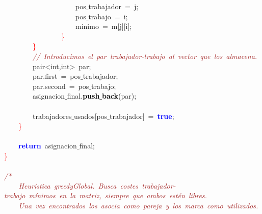 \mbox{}\ \ \ \ \ \ \ \ \ \ \ \ \ \ \ \ \ \ \ \ pos$\_$trabajador\ \textcolor{BrickRed}{=}\ j\textcolor{BrickRed}{;}\  \\
\mbox{}\ \ \ \ \ \ \ \ \ \ \ \ \ \ \ \ \ \ \ \ pos$\_$trabajo\ \textcolor{BrickRed}{=}\ i\textcolor{BrickRed}{;}\  \\
\mbox{}\ \ \ \ \ \ \ \ \ \ \ \ \ \ \ \ \ \ \ \ minimo\ \textcolor{BrickRed}{=}\ m\textcolor{BrickRed}{[}j\textcolor{BrickRed}{][}i\textcolor{BrickRed}{];}\  \\
\mbox{}\ \ \ \ \ \ \ \ \ \ \ \ \ \ \ \ \textcolor{Red}{\}}\ \ \ \  \\
\mbox{}\ \ \ \ \ \ \ \ \textcolor{Red}{\}} \\
\mbox{}\ \ \ \ \ \ \ \ \textit{\textcolor{Brown}{//\ Introducimos\ el\ par\ trabajador-trabajo\ al\ vector\ que\ los\ almacena.\ }} \\
\mbox{}\ \ \ \ \ \ \ \ \textcolor{TealBlue}{pair\textless{}int,int\textgreater{}}\ par\textcolor{BrickRed}{;}\  \\
\mbox{}\ \ \ \ \ \ \ \ par\textcolor{BrickRed}{.}first\ \textcolor{BrickRed}{=}\ pos$\_$trabajador\textcolor{BrickRed}{;}\  \\
\mbox{}\ \ \ \ \ \ \ \ par\textcolor{BrickRed}{.}second\ \textcolor{BrickRed}{=}\ pos$\_$trabajo\textcolor{BrickRed}{;}\  \\
\mbox{}\ \ \ \ \ \ \ \ asignacion$\_$final\textcolor{BrickRed}{.}\textbf{\textcolor{Black}{push$\_$back}}\textcolor{BrickRed}{(}par\textcolor{BrickRed}{);}\  \\
\mbox{} \\
\mbox{}\ \ \ \ \ \ \ \ trabajadores$\_$usados\textcolor{BrickRed}{[}pos$\_$trabajador\textcolor{BrickRed}{]}\ \textcolor{BrickRed}{=}\ \textbf{\textcolor{Blue}{true}}\textcolor{BrickRed}{;}\  \\
\mbox{}\ \ \ \ \textcolor{Red}{\}} \\
\mbox{} \\
\mbox{}\ \ \ \ \textbf{\textcolor{Blue}{return}}\ asignacion$\_$final\textcolor{BrickRed}{;}\  \\
\mbox{}\textcolor{Red}{\}} \\
\mbox{} \\
\mbox{}\textit{\textcolor{Brown}{/*}} \\
\mbox{}\textit{\textcolor{Brown}{\ \ \ \ Heurística\ greedyGlobal.\ Busca\ costes\ trabajador-trabajo\ mínimos\ en\ la\ matriz,\ siempre\ que\ ambos\ estén\ libres.\ }} \\
\mbox{}\textit{\textcolor{Brown}{\ \ \ \ Una\ vez\ encontrados\ los\ asocia\ como\ pareja\ y\ los\ marca\ como\ utilizados.\ }} \\
